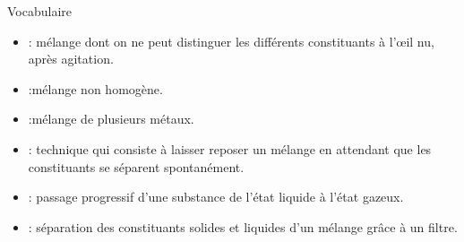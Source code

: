 \documentclass[xcolor={dvipsnames}]{beamer}
\begin{document}
\begin{frame}

\begin{block}{\Large{Vocabulaire}}
	\begin{itemize}
		\item {} : \pause mélange dont on ne peut distinguer les différents constituants à l'\oe il nu, après agitation.\pause
		
		\item {} :\pause mélange non homogène.\pause
		
		\item {} :\pause mélange de plusieurs métaux.\pause
		
		\item {} : \pause technique qui consiste à laisser reposer un mélange en attendant que les constituants se séparent spontanément.\pause
		
		\item {} : \pause passage progressif d'une substance de l'état liquide à l'état gazeux.\pause
		
		\item {} : \pause séparation des constituants solides et liquides d'un mélange grâce à un filtre.
	\end{itemize}
\end{block}

\end{frame}
\end{document}
